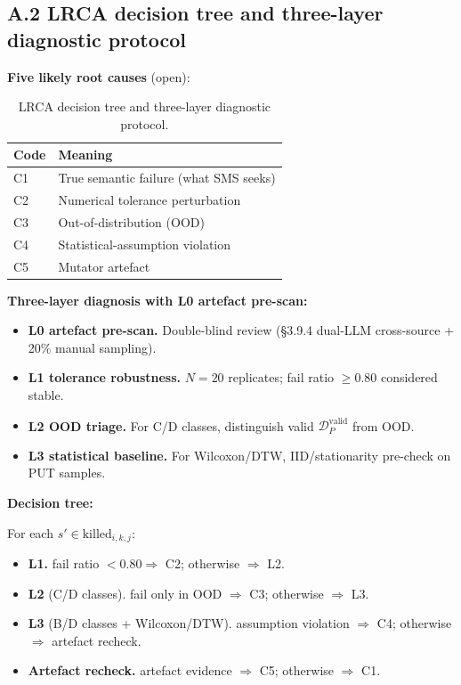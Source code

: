 \documentclass[manuscript,screen,review]{acmart}
\begin{document}
\subsection{A.2 LRCA decision tree and three-layer diagnostic protocol}\label{a.2-lrca-decision-tree-and-three-layer-diagnostic-protocol}

\textbf{Five likely root causes} (open):

{%
\begin{longtable}[]{@{}ll@{}}
\caption{LRCA decision tree and three-layer diagnostic protocol.}\label{tab:p2-15}\\
\toprule\noalign{}
Code & Meaning \\
\midrule\noalign{}
\endfirsthead
\endhead
\bottomrule\noalign{}
\endlastfoot
C1 & True semantic failure (what SMS seeks) \\
C2 & Numerical tolerance perturbation \\
C3 & Out-of-distribution (OOD) \\
C4 & Statistical-assumption violation \\
C5 & Mutator artefact \\
\end{longtable}
}

\textbf{Three-layer diagnosis with L0 artefact pre-scan:}

\begin{itemize}
\item \textbf{L0 artefact pre-scan.} Double-blind review (§3.9.4 dual-LLM cross-source + 20\% manual sampling).
\item \textbf{L1 tolerance robustness.} $N = 20$ replicates; fail ratio $\geq 0.80$ considered stable.
\item \textbf{L2 OOD triage.} For C/D classes, distinguish valid $\mathcal{D}_P^{\text{valid}}$ from OOD.
\item \textbf{L3 statistical baseline.} For Wilcoxon/DTW, IID/stationarity pre-check on PUT samples.
\end{itemize}

\textbf{Decision tree:}

For each $s' \in \mathrm{killed}_{i,k,j}$:
\begin{itemize}
\item \textbf{L1.} fail ratio $< 0.80 \Rightarrow$ C2; otherwise $\Rightarrow$ L2.
\item \textbf{L2} (C/D classes). fail only in OOD $\Rightarrow$ C3; otherwise $\Rightarrow$ L3.
\item \textbf{L3} (B/D classes + Wilcoxon/DTW). assumption violation $\Rightarrow$ C4; otherwise $\Rightarrow$ artefact recheck.
\item \textbf{Artefact recheck.} artefact evidence $\Rightarrow$ C5; otherwise $\Rightarrow$ C1.
\end{itemize}
\end{document}
